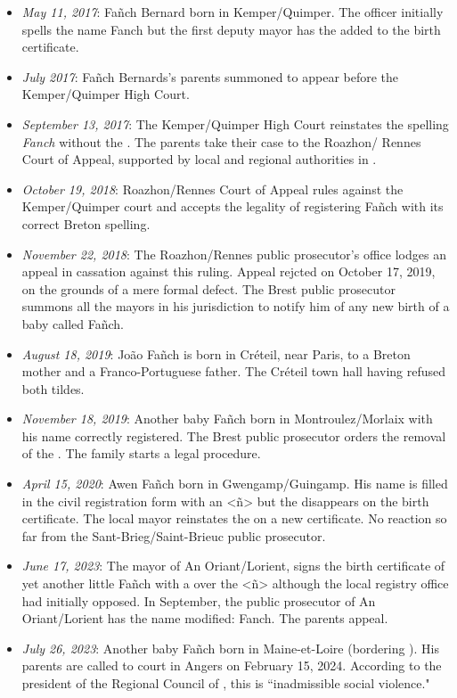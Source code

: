 \documentclass[output=paper,colorlinks,citecolor=brown]{langscibook}
\begin{document}


\begin{itemize}
\item {\textit{May 11, 2017}: Fañch Bernard born in Kemper/Quimper. The officer initially spells the name Fanch but the first deputy mayor has the  added to the birth certificate.}
\item {\textit{July 2017}: Fañch Bernards’s parents summoned to appear before the Kemper/Quimper High Court.}
\item {\textit{September 13, 2017}: The Kemper/Quimper High Court reinstates the spell\-ing \textit{Fanch} without the . The parents take their case to the Roazhon/ Rennes Court of Appeal, supported by local and regional authorities in .}
\item {\textit{October 19, 2018}: Roazhon/Rennes Court of Appeal rules against the Kemper/Quimper court and accepts the legality of registering Fañch with its correct Breton spelling.}
\item {\textit{November 22, 2018}: The Roazhon/Rennes public prosecutor's office lodges an appeal in cassation against this ruling. Appeal rejcted on October 17, 2019, on the grounds of a mere formal defect. The Brest public prosecutor summons all the mayors in his jurisdiction to notify him of any new birth of a baby called Fañch.}
\item {\textit{August 18, 2019}: João Fañch is born in Créteil, near Paris, to a Breton mother and a Franco-Portuguese father. The Créteil town hall having refused both tildes.}
\item {\textit{November 18, 2019}: Another baby Fañch born in Montroulez/Morlaix with his name correctly registered. The Brest public prosecutor orders the removal of the . The family starts a legal procedure.} 
\item {\textit{April 15, 2020}: Awen Fañch born in Gwengamp/Guingamp. His name is filled in the civil registration form with an <ñ> but the  disappears on the birth certificate. The local mayor reinstates the  on a new certificate. No reaction so far from the Sant-Brieg/Saint-Brieuc public prosecutor.}
\item \textit{June 17, 2023}: The mayor of An Oriant/Lorient, signs the birth certificate of yet another little Fañch with a  over the <ñ> although the local registry office had initially opposed. In September, the public prosecutor of An Oriant/Lorient has the name modified: Fanch. The parents appeal.
\item{\textit{July 26, 2023}: Another baby Fañch born in Maine-et-Loire (bordering ). His parents are called to court in Angers on February 15, 2024. According to the president of the Regional Council of , this is ``inadmissible social violence."}
\end{itemize}
\end{document}
